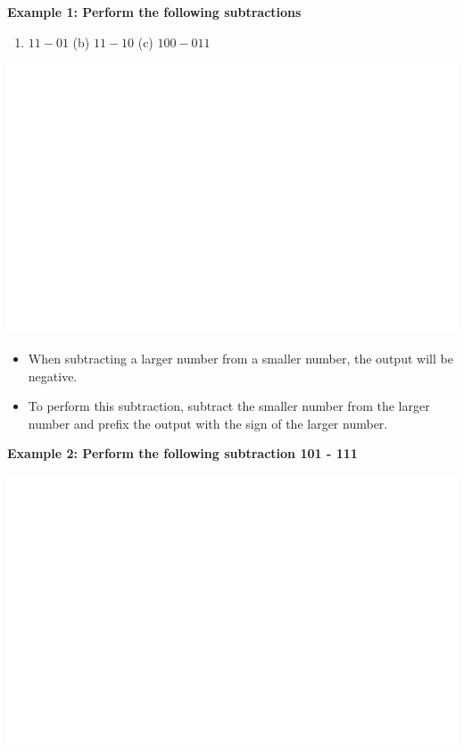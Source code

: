 \documentclass[]{book}
\providecommand{\tightlist}{%
  \setlength{\itemsep}{0pt}\setlength{\parskip}{0pt}}
\begin{document}
\textbf{Example 1: Perform the following subtractions}

\begin{enumerate}
\def\labelenumi{(\alph{enumi})}
\tightlist
\item
  \(11- 01\) (b) \(11-10\) (c) \(100-011\)
\end{enumerate}

\begin{center}\includegraphics[width=1\linewidth]{figure/NSbox23-1} \end{center}

\begin{itemize}
\tightlist
\item
  When subtracting a larger number from a smaller number, the output will be negative.
\item
  To perform this subtraction, subtract the smaller number from the larger number and prefix the output with the sign of the larger number.
\end{itemize}

\textbf{Example 2: Perform the following subtraction 101 - 111}

\begin{center}\includegraphics[width=1\linewidth]{figure/NSbox24-1} \end{center}
\end{document}
